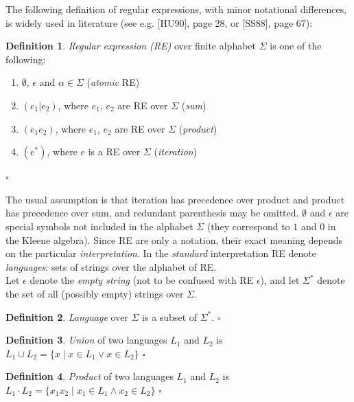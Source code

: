 \documentclass{article}
\newcommand{\Xin}{\!\in\!}
\theoremstyle{definition}
\newtheorem{Xdef}{Definition}
\begin{document}
\begin{multicols}{2}
The following definition of regular expressions, with minor notational differences, is widely used in literature
(see e.g. [HU90], page 28, or [SS88], page 67):

    \begin{Xdef}\label{re}
    \emph{Regular expression (RE)} over finite alphabet $\Sigma$ is one of the following:
    \begin{enumerate}
        \medskip
        \item[] $\emptyset$, $\epsilon$ and $\alpha \Xin \Sigma$ (\emph{atomic} RE)
        \item[] $(e_1 | e_2)$, where $e_1$, $e_2$ are RE over $\Sigma$ (\emph{sum})
        \item[] $(e_1 e_2)$,   where $e_1$, $e_2$ are RE over $\Sigma$ (\emph{product})
        \item[] $(e^*)$,       where $e$ is a RE over $\Sigma$ (\emph{iteration})
        \medskip
    \end{enumerate}
    $\square$
    \end{Xdef}

The usual assumption is that iteration has precedence over product and product has precedence over sum,
and redundant parenthesis may be omitted.
$\emptyset$ and $\epsilon$ are special symbols not included in the alphabet $\Sigma$ (they correspond to $1$ and $0$ in the Kleene algebra).
Since RE are only a notation, their exact meaning depends on the particular \emph{interpretation}.
In the \emph{standard} interpretation RE denote \emph{languages}: sets of strings over the alphabet of RE.
\\

Let $\epsilon$ denote the \emph{empty string} (not to be confused with RE $\epsilon$),
and let $\Sigma^*$ denote the set of all (possibly empty) strings over $\Sigma$.

    \begin{Xdef}
    \emph{Language} over $\Sigma$ is a subset of $\Sigma^*$.
    $\square$
    \end{Xdef}

    \begin{Xdef}\label{langunion}
    \emph{Union} of two languages $L_1$ and $L_2$ is
    $L_1 \cup L_2 = \{ x \mid x \Xin L_1 \vee x \Xin L_2 \}$
    $\square$
    \end{Xdef}

    \begin{Xdef}\label{langproduct}
    \emph{Product} of two languages $L_1$ and $L_2$ is
    $L_1 \cdot L_2 = \{ x_1 x_2 \mid x_1 \Xin L_1 \wedge x_2 \Xin L_2 \}$
    $\square$
    \end{Xdef}


\end{multicols}
\end{document}
